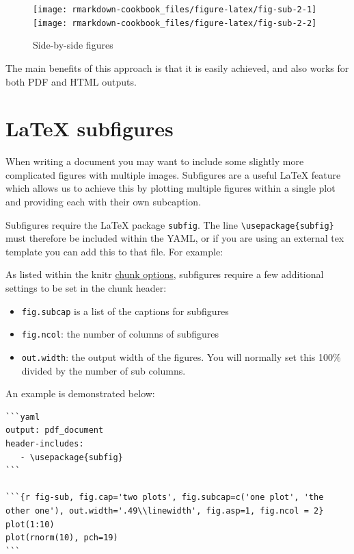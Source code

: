 \documentclass[]{book}
\providecommand{\tightlist}{%
  \setlength{\itemsep}{0pt}\setlength{\parskip}{0pt}}
\begin{document}
\begin{figure}
\texttt{[image: rmarkdown-cookbook\_files/figure-latex/fig-sub-2-1]} \texttt{[image: rmarkdown-cookbook\_files/figure-latex/fig-sub-2-2]} \caption{Side-by-side figures}\label{fig:fig-sub-2}
\end{figure}

The main benefits of this approach is that it is easily achieved, and
also works for both PDF and HTML outputs.

\section{LaTeX subfigures}\label{latex-subfigures}

When writing a document you may want to include some slightly more
complicated figures with multiple images. Subfigures are a useful LaTeX
feature which allows us to achieve this by plotting multiple figures
within a single plot and providing each with their own subcaption.

Subfigures require the LaTeX package \texttt{subfig}. The line
\texttt{\textbackslash{}usepackage\{subfig\}} must therefore be included
within the YAML, or if you are using an external tex template you can
add this to that file. For example:

As listed within the knitr
\href{https://yihui.name/knitr/options/}{chunk options}, subfigures
require a few additional settings to be set in the chunk header:

\begin{itemize}
\tightlist
\item
  \texttt{fig.subcap} is a list of the captions for subfigures
\item
  \texttt{fig.ncol}: the number of columns of subfigures
\item
  \texttt{out.width}: the output width of the figures. You will normally
  set this 100\% divided by the number of sub columns.
\end{itemize}

An example is demonstrated below:

\begin{verbatim}
```yaml
output: pdf_document
header-includes:
   - \usepackage{subfig}
```

```{r fig-sub, fig.cap='two plots', fig.subcap=c('one plot', 'the other one'), out.width='.49\\linewidth', fig.asp=1, fig.ncol = 2}
plot(1:10)
plot(rnorm(10), pch=19)
```
\end{verbatim}
\end{document}
